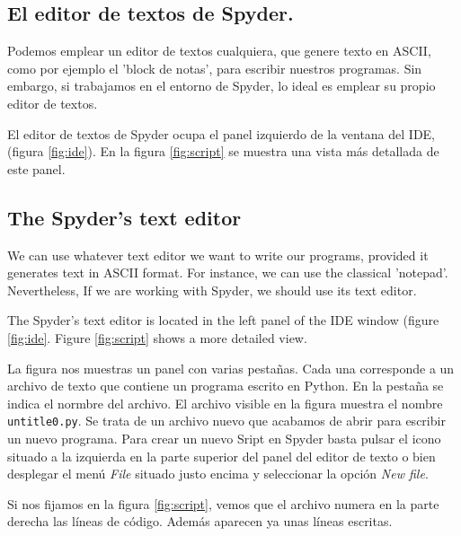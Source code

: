 \begin{paracol}{2}
\subsection{El editor de textos de Spyder.} 
Podemos emplear un editor de textos cualquiera, que genere texto en ASCII, como por ejemplo el 'block de notas', para escribir nuestros programas. Sin embargo, si trabajamos en el entorno de Spyder, lo ideal es emplear su propio editor de textos.

El editor de textos de Spyder ocupa el panel izquierdo de la ventana del IDE, (figura \ref{fig:ide}). En la figura \ref{fig:script} se muestra una vista más detallada de este panel.

\switchcolumn

\subsection{The Spyder's text editor}
We can use whatever text editor we want to write our programs, provided it generates text in ASCII format. For instance, we can use the classical 'notepad'. Nevertheless, If we are working with Spyder, we should use its text editor.

The Spyder's text editor is located in the left panel of the IDE window (figure \ref{fig:ide}. Figure \ref{fig:script} shows a more detailed view.

\switchcolumn
La figura nos muestras un panel con varias pestañas. Cada una corresponde a un archivo de texto que contiene un programa escrito en Python. En la pestaña se indica el normbre del archivo. El archivo visible en la figura muestra el nombre \texttt{untitle0.py}. Se trata de un archivo nuevo que acabamos de abrir para escribir un nuevo programa. Para crear un nuevo Sript en Spyder basta pulsar el icono situado a la izquierda en la parte superior del panel del editor de texto o bien desplegar el menú \emph{File} situado justo encima y seleccionar la opción \emph{New file}.

Si nos fijamos en la figura \ref{fig:script}, vemos que el archivo numera en la parte derecha las líneas de código. Además aparecen ya unas líneas escritas.


\end{paracol}

